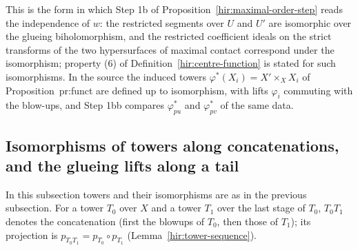 This is the form in which Step 1b of Proposition~\ref{hir:maximal-order-step} reads the independence of \(w\): the restricted segments over \(U\) and \(U'\) are isomorphic over the
glueing biholomorphism, and the restricted coefficient ideals on the strict transforms of the two hypersurfaces of maximal contact correspond under the isomorphism;
property (6) of Definition~\ref{hir:centre-function} is stated for such isomorphisms. In the source the induced towers \(\varphi^*(X_i)=X'\times_XX_i\) of Proposition~pr:funct
are defined up to isomorphism, with lifts \(\varphi_i\) commuting with the blow-ups, and Step 1bb compares \(\varphi_{pu}^*\) and \(\varphi_{pv}^*\) of the same data.

\subsection{Isomorphisms of towers along concatenations, and the glueing lifts along a tail}

In this subsection towers and their isomorphisms are as in the previous subsection. For a tower \(T_0\) over \(X\) and a tower \(T_1\) over the last stage of
\(T_0\), \(T_0T_1\) denotes the concatenation (first the blowups of \(T_0\), then those of \(T_1\)); its projection is \(p_{T_0T_1}=p_{T_0}\circ p_{T_1}\)
(Lemma~\ref{hir:tower-sequence}).

